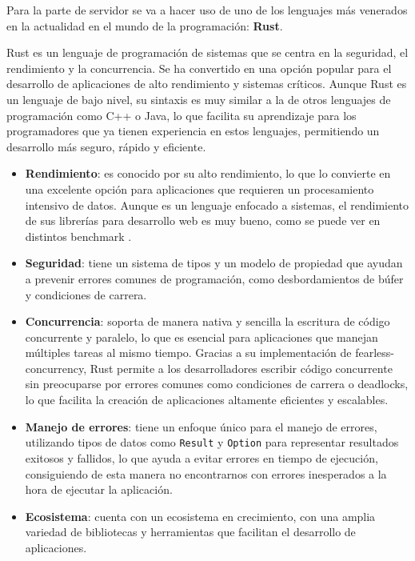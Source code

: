 Para la parte de servidor se va a hacer uso de uno de los lenguajes más venerados en la actualidad en el mundo de la programación: \textbf{Rust}.

Rust es un lenguaje de programación de sistemas que se centra en la seguridad, el rendimiento y la concurrencia. Se ha convertido en una opción popular para el desarrollo de aplicaciones de alto rendimiento y sistemas críticos.
Aunque Rust es un lenguaje de bajo nivel, su sintaxis es muy similar a la de otros lenguajes de programación como C++ o Java, lo que facilita su aprendizaje para los programadores que ya tienen experiencia en estos lenguajes, permitiendo un desarrollo más seguro, rápido y eficiente.

\begin{itemize}
    \item \textbf{Rendimiento}: es conocido por su alto rendimiento, lo que lo convierte en una excelente opción para aplicaciones que requieren un procesamiento intensivo de datos. Aunque es un lenguaje enfocado a sistemas, el rendimiento de sus librerías para desarrollo web es muy bueno, como se puede ver en distintos benchmark \parencite{rust-benchmark}.
    \item \textbf{Seguridad}: tiene un sistema de tipos y un modelo de propiedad que ayudan a prevenir errores comunes de programación, como desbordamientos de búfer y condiciones de carrera.
    \item \textbf{Concurrencia}: soporta de manera nativa y sencilla la escritura de código concurrente y paralelo, lo que es esencial para aplicaciones que manejan múltiples tareas al mismo tiempo.
        Gracias a su implementación de \gls{fearless-concurrency}, Rust permite a los desarrolladores escribir código concurrente sin preocuparse por errores comunes como condiciones de carrera o deadlocks, lo que facilita la creación de aplicaciones altamente eficientes y escalables.
    \item \textbf{Manejo de errores}: tiene un enfoque único para el manejo de errores, utilizando tipos de datos como \texttt{Result} y \texttt{Option} para representar resultados exitosos y fallidos, lo que ayuda a evitar errores en tiempo de ejecución, consiguiendo de esta manera no encontrarnos con errores inesperados a la hora de ejecutar la aplicación.
    \item \textbf{Ecosistema}: cuenta con un ecosistema en crecimiento, con una amplia variedad de bibliotecas y herramientas que facilitan el desarrollo de aplicaciones.
\end{itemize}


